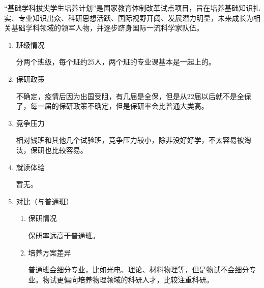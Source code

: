 \documentclass[zihao=-4,fontset=none]{Beautybook-CN}
\begin{document}
“基础学科拔尖学生培养计划”是国家教育体制改革试点项目，旨在培养基础知识扎实、专业知识出众、科研思想活跃、国际视野开阔、发展潜力明显，未来成长为相关基础学科领域的领军人物，并逐步跻身国际一流科学家队伍。
\begin{enumerate}
			
	\item 班级情况
	      	      	      
	      分两个班级，每个班约25人，两个班的专业课基本是一起上的。
	      	      	      
	\item 保研政策
	      	      	      
	      不确定，疫情后因为出国受阻，有几届是全保，但是从22届以后就不是全保了，每一届的保研政策不确定，但是保研率会比普通大类高。
	      	      
	\item 竞争压力
	      	      	      
	      相对钱班和其他几个试验班，竞争压力较小，除非没好好学，不太容易被淘汰，保研也比较容易。
	       	      
	\item 就读体验
	      	      	      
	      暂无。
	      	      	      
	\item 对比（与普通班）
	      	      	      
	      \begin{enumerate}
	      	\item 保研情况
	      	      	      	      	      	      
	      	      保研率远高于普通班。
	      	      	      	      	      	      
	      	\item 培养方案差异
	      	      	      	      	      	      
	      	      普通班会细分专业，比如光电、理论、材料物理等，但是物试不会细分专业。物试更偏向培养物理领域的科研人才，比较注重科研。
	      \end{enumerate}
\end{enumerate}
\end{document}
